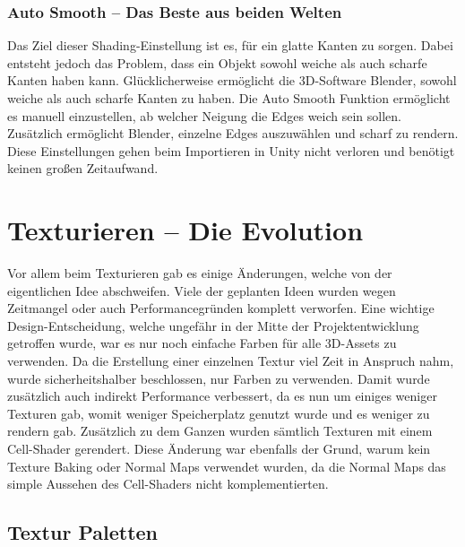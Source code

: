 \subsubsection{Auto Smooth – Das Beste aus beiden Welten}

Das Ziel dieser Shading-Einstellung ist es, für ein glatte Kanten zu sorgen. Dabei entsteht jedoch das Problem, dass ein Objekt sowohl weiche als auch scharfe Kanten haben kann. Glücklicherweise ermöglicht die 3D-Software Blender, sowohl weiche als auch scharfe Kanten zu haben. Die Auto Smooth Funktion ermöglicht es manuell einzustellen, ab welcher Neigung die Edges weich sein sollen. 
Zusätzlich ermöglicht Blender, einzelne Edges auszuwählen und scharf zu rendern. Diese Einstellungen gehen beim Importieren in Unity nicht verloren und benötigt keinen großen Zeitaufwand.

\section{Texturieren – Die Evolution}

Vor allem beim Texturieren gab es einige Änderungen, welche von der eigentlichen Idee abschweifen. Viele der geplanten Ideen wurden wegen Zeitmangel oder auch Performancegründen komplett verworfen. Eine wichtige Design-Entscheidung, welche ungefähr in der Mitte der Projektentwicklung getroffen wurde, war es nur noch einfache Farben für alle 3D-Assets zu verwenden. Da die Erstellung einer einzelnen Textur viel Zeit in Anspruch nahm, wurde sicherheitshalber beschlossen, nur Farben zu verwenden. Damit wurde zusätzlich auch indirekt Performance verbessert, da es nun um einiges weniger Texturen gab, womit weniger Speicherplatz genutzt wurde und es weniger zu rendern gab. Zusätzlich zu dem Ganzen wurden sämtlich Texturen mit einem Cell-Shader gerendert.
Diese Änderung war ebenfalls der Grund, warum kein Texture Baking oder Normal Maps verwendet wurden, da die Normal Maps das simple Aussehen des Cell-Shaders nicht komplementierten.

\subsection{Textur Paletten}

